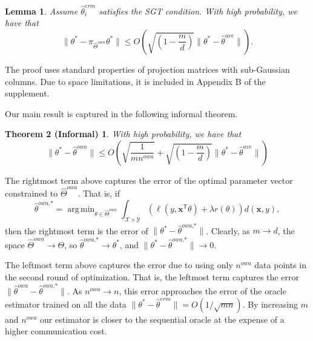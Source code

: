 \documentclass[twoside]{article}
\newtheorem{lemma}{Lemma}
\DeclareMathOperator*{\argmin}{arg\,min}
\newcommand{\nowa}{n^{\textit{owa}}}
\newcommand{\Y}{\mathcal{Y}}
\newcommand{\X}{\mathcal{X}}
\newcommand{\W}{{\hat \Theta^{\textit{owa}}}}
\newcommand{\x}{\mathbf{x}}
\newcommand{\w}{\theta}
\newcommand{\wowa}{\hat\w^{owa}}
\newcommand{\wowastar}{\hat\w^{\textit{owa,*}}}
\newcommand{\wave}{\hat\w^{ave}}
\newcommand{\wmle}{\hat\w^{erm}}
\newcommand{\wstar}{{\w^{*}}}
\newcommand{\reg}{r}
\newcommand{\loss}{\ell}
\newcommand{\trans}[1]{\ensuremath{{#1}^{\mathsf{T}}}}
\newcommand{\ltwo}[1]{{\lVert {#1} \rVert}}
\newcommand{\proj}[1]{\pi_{{#1}}}
\begin{document}
\begin{lemma}
\label{lem:proj}
Assume $\wmle_i$ satisfies the SGT condition.
With high probability, we have that
\begin{equation}
\ltwo{\wstar-\proj\W\wstar}
\le
O\left(
\sqrt{\left(1-\frac{m}{d}\right)}\ltwo{\wstar - \wave}
\right)
.
\end{equation}
\end{lemma}

The proof uses standard properties of projection matrices with sub-Gaussian columns.
Due to space limitations, it is included in Appendix B of the supplement.

Our main result is captured in the following informal theorem.
\newtheorem*{theoreminf}{Theorem 2 (Informal)}
\begin{theoreminf}
With high probability, we have that
\begin{equation}
\nonumber
\ltwo{\wstar-\wowa}
\le
O\!\left(\!\!
    \sqrt{\frac{1}{m\nowa}}
    +
    \sqrt{\left(1-\frac{m}{d}\right)}\ltwo{\wstar-\wave}
\right)
\label{eq:informal}
\end{equation}
\label{thm:informal}
\end{theoreminf}
\vspace{-0.25in}
The rightmost term above captures the error of the optimal parameter vector constrained to $\W$.
That is, if
\begin{equation}
\wowastar = \argmin_{\w\in\W} \int_{\X\times\Y} \left(\loss(y,\trans\x\w) + \lambda \reg(\w)\right) d(\x,y)
,
\end{equation}
then the rightmost term is the error of $\ltwo{\wstar-\wowastar}$.
Clearly, as $m \to d$, the space $\W \to \Theta$, so $\wowastar\to\wstar$, and $\ltwo{\wstar-\wowastar}\to 0$.

The leftmost term above captures the error due to using only $\nowa$ data points in the second round of optimization.
That is, the leftmost term captures the error $\ltwo{\wowa-\wowastar}$.
As $\nowa\to n$, this error approaches the error of the oracle estimator trained on all the data $\ltwo{\wstar-\wmle}=O(1/\sqrt{mn})$.
By increasing $m$ and $\nowa$ our estimator is closer to the sequential oracle
at the expense of a higher communication cost.


\end{document}
